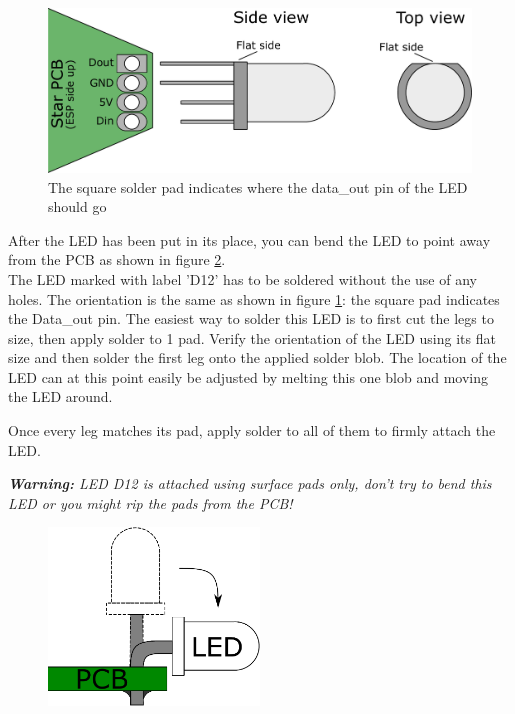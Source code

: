 \documentclass[12pt]{article}
\begin{document}
\label{subsec:ledOrientation}
\begin{figure}[H]
	\centering
	\includegraphics[width=\textwidth]{../images/manual/led_orientation.pdf}
	\caption{The square solder pad indicates where the data\_out pin of the LED should go}
	\label{fig:ledOrientation}
\end{figure}

\noindent After the LED has been put in its place, you can bend the LED to point away from the PCB as shown in figure \ref{fig:ledBent}. \\


\noindent The LED marked with label 'D12' has to be soldered without the use of any holes. The orientation is the same as shown in figure \ref{fig:ledOrientation}: the square pad indicates the Data\_out pin. The easiest way to solder this LED is to first cut the legs to size, then apply solder to 1 pad. Verify the orientation of the LED using its flat size and then solder the first leg onto the applied solder blob. The location of the LED can at this point easily be adjusted by melting this one blob and moving the LED around.

\noindent Once every leg matches its pad, apply solder to all of them to firmly attach the LED.

\vspace{1ex}
\noindent \textit{\textbf{Warning:} LED D12 is attached using surface pads only, don't try to bend this LED or you might rip the pads from the PCB!}

\begin{figure}[H]
	\centering
	\includegraphics[width=0.5\textwidth]{../images/manual/led_bent.pdf}
	\caption{}
	\label{fig:ledBent}
\end{figure}
\end{document}
